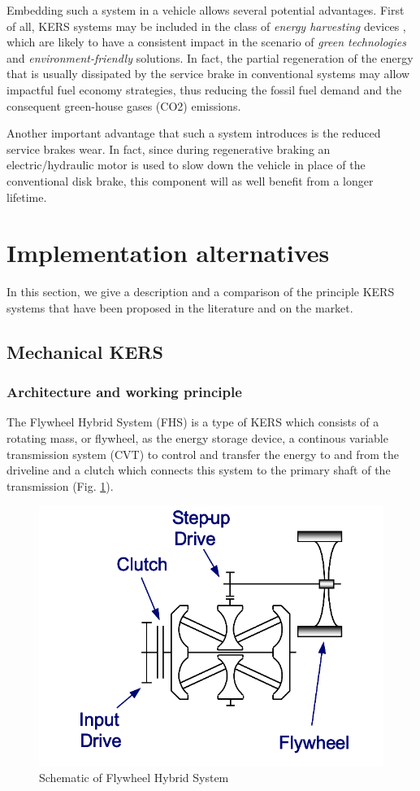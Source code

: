 \documentclass[11pt]{article}
\begin{document}
Embedding such a system in a vehicle allows several potential advantages. First of all, KERS systems may be included in the class of \textit{energy harvesting} devices \cite{c}, which are likely to have a consistent impact in the scenario of \textit{green technologies} and \textit{environment-friendly} solutions. In fact, the partial regeneration of the energy that is usually dissipated by the service brake in conventional systems may allow impactful fuel economy strategies, thus reducing the fossil fuel demand and the consequent green-house gases (CO2) emissions. 

Another important advantage that such a system introduces is the reduced service brakes wear. In fact, since during regenerative braking an electric/hydraulic motor is used to slow down the vehicle in place of the conventional disk brake, this component will as well benefit from a longer lifetime. 

\section{Implementation alternatives}

In this section, we give a description and a comparison of the principle KERS systems that have been proposed in the literature and on the market.

\subsection{Mechanical KERS}

\subsubsection{Architecture and working principle}

The Flywheel Hybrid System (FHS) is a type of KERS which consists of a rotating mass, or flywheel, as the energy storage device, a continous variable transmission system (CVT) to control and transfer the energy to and from the driveline and a clutch which connects this system to the primary shaft of the transmission (Fig. \ref{fig: FHS}). 

\begin{figure}[H]
\centering
\includegraphics[width=.6\textwidth]{Images/State_of_the_art/Mechanical_KERS.png}
\caption{Schematic of Flywheel Hybrid System}
\label{fig: FHS}
\end{figure}
\end{document}
